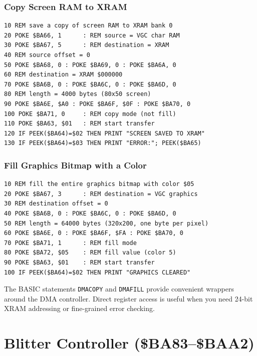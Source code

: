 \subsubsection{Copy Screen RAM to XRAM}

\begin{lstlisting}
10 REM save a copy of screen RAM to XRAM bank 0
20 POKE $BA66, 1      : REM source = VGC char RAM
30 POKE $BA67, 5      : REM destination = XRAM
40 REM source offset = 0
50 POKE $BA68, 0 : POKE $BA69, 0 : POKE $BA6A, 0
60 REM destination = XRAM $000000
70 POKE $BA6B, 0 : POKE $BA6C, 0 : POKE $BA6D, 0
80 REM length = 4000 bytes (80x50 screen)
90 POKE $BA6E, $A0 : POKE $BA6F, $0F : POKE $BA70, 0
100 POKE $BA71, 0     : REM copy mode (not fill)
110 POKE $BA63, $01   : REM start transfer
120 IF PEEK($BA64)=$02 THEN PRINT "SCREEN SAVED TO XRAM"
130 IF PEEK($BA64)=$03 THEN PRINT "ERROR:"; PEEK($BA65)
\end{lstlisting}

\subsubsection{Fill Graphics Bitmap with a Color}

\begin{lstlisting}
10 REM fill the entire graphics bitmap with color $05
20 POKE $BA67, 3      : REM destination = VGC graphics
30 REM destination offset = 0
40 POKE $BA6B, 0 : POKE $BA6C, 0 : POKE $BA6D, 0
50 REM length = 64000 bytes (320x200, one byte per pixel)
60 POKE $BA6E, 0 : POKE $BA6F, $FA : POKE $BA70, 0
70 POKE $BA71, 1      : REM fill mode
80 POKE $BA72, $05    : REM fill value (color 5)
90 POKE $BA63, $01    : REM start transfer
100 IF PEEK($BA64)=$02 THEN PRINT "GRAPHICS CLEARED"
\end{lstlisting}

\begin{tipbox}
The BASIC statements \texttt{DMACOPY} and \texttt{DMAFILL} provide
convenient wrappers around the DMA controller.  Direct register access
is useful when you need 24-bit XRAM addressing or fine-grained error
checking.
\end{tipbox}


\section{Blitter Controller (\$BA83--\$BAA2)}
\label{sec:blitter}

